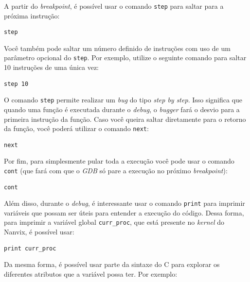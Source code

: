 \documentclass[11pt]{article}
\begin{document}
A partir do \textit{breakpoint}, é possível usar o comando \texttt{step} para saltar para a próxima instrução:\\

\begin{lstlisting}[language=sh,numbers=none,frame=single]
step
\end{lstlisting}

Você também pode saltar um número definido de instruções com uso de um parâmetro opcional do \texttt{step}. Por exemplo, utilize o seguinte comando para saltar 10 instruções de uma única vez:\\

\begin{lstlisting}[language=sh,numbers=none,frame=single]
step 10
\end{lstlisting}

O comando \texttt{step} permite realizar um \textit{bug} do tipo \textit{step by step}. Isso significa que quando uma função é executada durante o \textit{debug}, o \textit{bugger} fará o desvio para a primeira instrução da função. Caso você queira saltar diretamente para o retorno da função, você poderá utilizar o comando \texttt{next}:\\

\begin{lstlisting}[language=sh,numbers=none,frame=single]
next
\end{lstlisting}

Por fim, para simplesmente pular toda a execução você pode usar o comando \texttt{cont} (que fará com que o \textit{GDB} só pare a execução no próximo \textit{breakpoint}): \\

\begin{lstlisting}[language=sh,numbers=none,frame=single]
cont
\end{lstlisting}

Além disso, durante o \textit{debug}, é interessante usar o comando \texttt{print} para imprimir variáveis que possam ser úteis para entender a execução do código. Dessa forma, para imprimir a variável global \texttt{curr\_proc}, que está presente no \textit{kernel} do Nanvix, é possível usar:\\

\begin{lstlisting}[language=sh,numbers=none,frame=single]
print curr_proc
\end{lstlisting}

Da mesma forma, é possível usar parte da sintaxe do C para explorar os diferentes atributos que a variável possa ter. Por exemplo:\\
\end{document}
